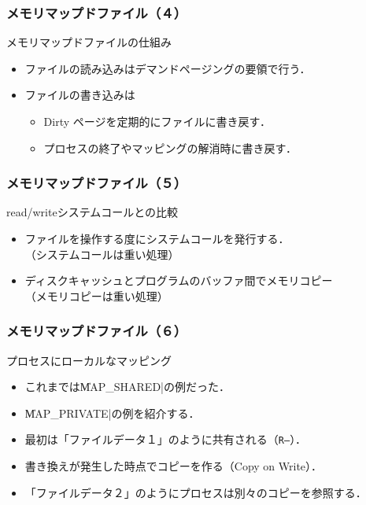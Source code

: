 \documentclass{beamer}                   %
\begin{document}
\begin{frame}
  \frametitle{メモリマップドファイル（４）}
  メモリマップドファイルの仕組み
  \begin{itemize}
  \item ファイルの読み込みはデマンドページングの要領で行う．
  \item ファイルの書き込みは
    \begin{itemize}
      \item Dirty ページを定期的にファイルに書き戻す．
      \item プロセスの終了やマッピングの解消時に書き戻す．
    \end{itemize}
  \end{itemize}
\end{frame}

\begin{frame}
  \frametitle{メモリマップドファイル（５）}
  read/writeシステムコールとの比較
  \begin{itemize}
  \item ファイルを操作する度にシステムコールを発行する．\\
    （システムコールは重い処理）
  \item ディスクキャッシュとプログラムのバッファ間でメモリコピー\\
    （メモリコピーは重い処理）
  \end{itemize}
\end{frame}

\begin{frame}[fragile]
  \frametitle{メモリマップドファイル（６）}
  プロセスにローカルなマッピング
  \begin{itemize}
  \item これまでは\|MAP_SHARED|の例だった．
  \item \|MAP_PRIVATE|の例を紹介する．
  \item 最初は「ファイルデータ１」のように共有される（\texttt{R--}）．
  \item 書き換えが発生した時点でコピーを作る（Copy on Write）．
  \item 「ファイルデータ２」のようにプロセスは別々のコピーを参照する．
  \end{itemize}
\end{frame}
\end{document}
